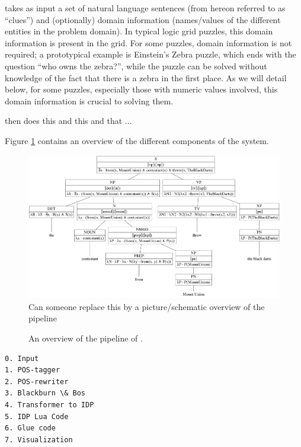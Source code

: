 


\ourtool takes as input a set of natural language sentences (from hereon referred to as ``clues'') and (optionally) domain information (names/values of the different entities in the problem domain).
In typical logic grid puzzles, this domain information is present in the grid. 
For some puzzles, domain information is not required; a prototypical example is Einstein's Zebra puzzle, which ends with the question ``who owns the zebra?'', while the puzzle can be solved without knowledge of the fact that there is a zebra in the first place. 
As we will detail below, for some puzzles, especially those with numeric values involved, this domain information is crucial to solving them. 

\ourtool then does this and this and that ... 

Figure \ref{fig:overview} contains an overview of the different components of the system.

\begin{figure}
\centering
\includegraphics[width=\textwidth]{../../poster/graphviz/tree.jpg}
 Can someone replace this by a picture/schematic overview of the pipeline
 \caption{An overview of the pipeline of \ourtool.}
 \label{fig:overview}
\end{figure}




\begin{verbatim}
0. Input
1. POS-tagger
2. POS-rewriter
3. Blackburn \& Bos
4. Transformer to IDP
5. IDP Lua Code
6. Glue code
7. Visualization
\end{verbatim}


